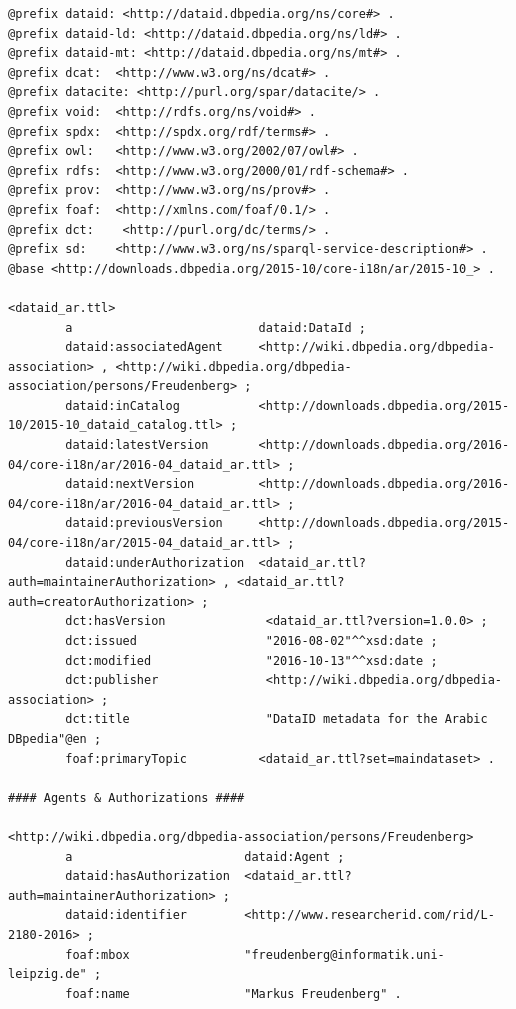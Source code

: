 \documentclass[a4paper,english,twoside,BCOR1.5cm,headsepline,DIV12,appendixprefix,final,12pt]{scrbook}
\begin{document}
%
%
\printbibliography[title=References]

\label{chap:appendix1}
\begin{lstlisting}[language=ttl, captionpos=b, label=lst:dcex,linewidth=\columnwidth,breaklines=true,basicstyle=\ttfamily\scriptsize]
@prefix dataid: <http://dataid.dbpedia.org/ns/core#> .
@prefix dataid-ld: <http://dataid.dbpedia.org/ns/ld#> .
@prefix dataid-mt: <http://dataid.dbpedia.org/ns/mt#> .
@prefix dcat:  <http://www.w3.org/ns/dcat#> .
@prefix datacite: <http://purl.org/spar/datacite/> .
@prefix void:  <http://rdfs.org/ns/void#> .
@prefix spdx:  <http://spdx.org/rdf/terms#> .
@prefix owl:   <http://www.w3.org/2002/07/owl#> .
@prefix rdfs:  <http://www.w3.org/2000/01/rdf-schema#> .
@prefix prov:  <http://www.w3.org/ns/prov#> .
@prefix foaf:  <http://xmlns.com/foaf/0.1/> .
@prefix dct:    <http://purl.org/dc/terms/> .
@prefix sd:    <http://www.w3.org/ns/sparql-service-description#> .
@base <http://downloads.dbpedia.org/2015-10/core-i18n/ar/2015-10_> .

<dataid_ar.ttl>
        a                          dataid:DataId ;
        dataid:associatedAgent     <http://wiki.dbpedia.org/dbpedia-association> , <http://wiki.dbpedia.org/dbpedia-association/persons/Freudenberg> ;
        dataid:inCatalog           <http://downloads.dbpedia.org/2015-10/2015-10_dataid_catalog.ttl> ;
        dataid:latestVersion       <http://downloads.dbpedia.org/2016-04/core-i18n/ar/2016-04_dataid_ar.ttl> ;
        dataid:nextVersion         <http://downloads.dbpedia.org/2016-04/core-i18n/ar/2016-04_dataid_ar.ttl> ;
    	dataid:previousVersion     <http://downloads.dbpedia.org/2015-04/core-i18n/ar/2015-04_dataid_ar.ttl> ;
        dataid:underAuthorization  <dataid_ar.ttl?auth=maintainerAuthorization> , <dataid_ar.ttl?auth=creatorAuthorization> ;
        dct:hasVersion              <dataid_ar.ttl?version=1.0.0> ;
        dct:issued                  "2016-08-02"^^xsd:date ;
        dct:modified                "2016-10-13"^^xsd:date ;
        dct:publisher               <http://wiki.dbpedia.org/dbpedia-association> ;
        dct:title                   "DataID metadata for the Arabic DBpedia"@en ;
        foaf:primaryTopic          <dataid_ar.ttl?set=maindataset> .

#### Agents & Authorizations ####

<http://wiki.dbpedia.org/dbpedia-association/persons/Freudenberg>
        a                        dataid:Agent ;
        dataid:hasAuthorization  <dataid_ar.ttl?auth=maintainerAuthorization> ;
        dataid:identifier        <http://www.researcherid.com/rid/L-2180-2016> ;
        foaf:mbox                "freudenberg@informatik.uni-leipzig.de" ;
        foaf:name                "Markus Freudenberg" .
        

\end{lstlisting}
\end{document}
